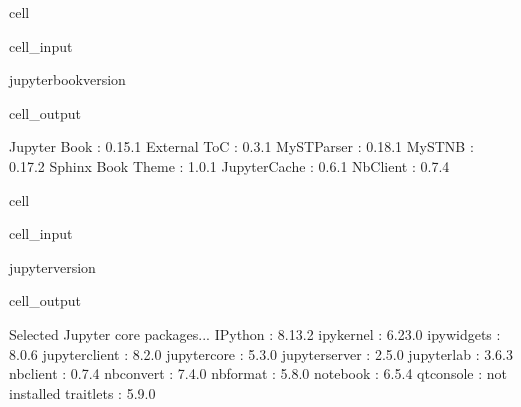 \documentclass[letterpaper,table,10pt,english]{jupyterBook}
\begin{document}
\begin{sphinxuseclass}{cell}\begin{sphinxVerbatimInput}

\begin{sphinxuseclass}{cell_input}
\begin{sphinxVerbatim}[commandchars=\\\{\}]
jupyter\PYGZhy{}book\PYGZhy{}\PYGZhy{}version
\end{sphinxVerbatim}

\end{sphinxuseclass}\end{sphinxVerbatimInput}
\begin{sphinxVerbatimOutput}

\begin{sphinxuseclass}{cell_output}
\begin{sphinxVerbatim}[commandchars=\\\{\}]
Jupyter Book      : 0.15.1
External ToC      : 0.3.1
MyST\PYGZhy{}Parser       : 0.18.1
MyST\PYGZhy{}NB           : 0.17.2
Sphinx Book Theme : 1.0.1
Jupyter\PYGZhy{}Cache     : 0.6.1
NbClient          : 0.7.4
\end{sphinxVerbatim}

\end{sphinxuseclass}\end{sphinxVerbatimOutput}

\end{sphinxuseclass}
\begin{sphinxuseclass}{cell}\begin{sphinxVerbatimInput}

\begin{sphinxuseclass}{cell_input}
\begin{sphinxVerbatim}[commandchars=\\\{\}]
jupyter\PYGZhy{}\PYGZhy{}version
\end{sphinxVerbatim}

\end{sphinxuseclass}\end{sphinxVerbatimInput}
\begin{sphinxVerbatimOutput}

\begin{sphinxuseclass}{cell_output}
\begin{sphinxVerbatim}[commandchars=\\\{\}]
Selected Jupyter core packages...
IPython          : 8.13.2
ipykernel        : 6.23.0
ipywidgets       : 8.0.6
jupyter\PYGZus{}client   : 8.2.0
jupyter\PYGZus{}core     : 5.3.0
jupyter\PYGZus{}server   : 2.5.0
jupyterlab       : 3.6.3
nbclient         : 0.7.4
nbconvert        : 7.4.0
nbformat         : 5.8.0
notebook         : 6.5.4
qtconsole        : not installed
traitlets        : 5.9.0
\end{sphinxVerbatim}

\end{sphinxuseclass}\end{sphinxVerbatimOutput}

\end{sphinxuseclass}
\end{document}
